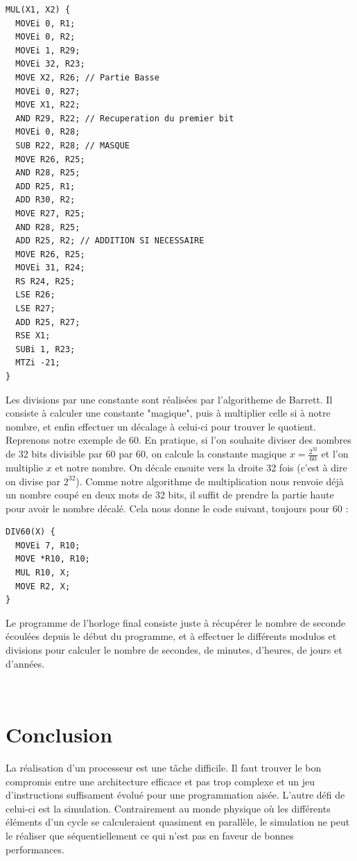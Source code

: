 \documentclass[a4paper, 12pt, twoside]{report}
\begin{document}
\begin{lstlisting}
MUL(X1, X2) {
  MOVEi 0, R1;
  MOVEi 0, R2;
  MOVEi 1, R29;
  MOVEi 32, R23;
  MOVE X2, R26; // Partie Basse
  MOVEi 0, R27; 
  MOVE X1, R22;
  AND R29, R22; // Recuperation du premier bit
  MOVEi 0, R28;
  SUB R22, R28; // MASQUE
  MOVE R26, R25;
  AND R28, R25;
  ADD R25, R1;
  ADD R30, R2;
  MOVE R27, R25;
  AND R28, R25;
  ADD R25, R2; // ADDITION SI NECESSAIRE
  MOVE R26, R25;
  MOVEi 31, R24;
  RS R24, R25;
  LSE R26;
  LSE R27;
  ADD R25, R27;
  RSE X1;
  SUBi 1, R23;
  MTZi -21;
}
\end{lstlisting}

Les divisions par une constante sont réalisées par l'algoritheme de Barrett. 
Il consiste à calculer une constante "magique", puis à multiplier celle si à notre nombre, et enfin 
effectuer un décalage à celui-ci pour trouver le quotient. Reprenons notre exemple de 60. 
En pratique, si l'on souhaite diviser des nombres de 32 bits divisible par 60 par 60, on calcule 
la constante magique $x = \frac{2^{32}}{60}$ et l'on multiplie $x$ et notre nombre. On décale ensuite 
vers la droite 32 fois (c'est à dire on divise par $2^{32}$). Comme notre algorithme de multiplication 
nous renvoie déjà un nombre coupé en deux mots de 32 bits, il suffit de prendre la partie haute pour avoir 
le nombre décalé. Cela nous donne le code suivant, toujours pour 60 :\\
\begin{lstlisting}
DIV60(X) {
  MOVEi 7, R10;
  MOVE *R10, R10;
  MUL R10, X;
  MOVE R2, X;
}
\end{lstlisting}

Le programme de l'horloge final consiste juste à récupérer le nombre de seconde écoulées depuis 
le début du programme, et à effectuer le différents modulos et divisions pour calculer le nombre 
de secondes, de minutes, d'heures, de jours et d'années.

\newpage~

\section*{Conclusion}
La réalisation d'un processeur est une tâche difficile. Il faut trouver le bon compromis 
entre une architecture efficace et pas trop complexe et un jeu d'instructions suffisament 
évolué pour une programmation aisée. L'autre défi de celui-ci est la simulation. 
Contrairement au monde physique où les différents éléments d'un cycle se calculeraient quasiment 
en parallèle, le simulation ne peut le réaliser que séquentiellement ce qui n'est pas en faveur de 
bonnes performances.

\end{document}
